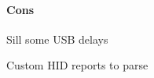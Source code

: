 \documentclass[a4paper,10pt]{article}
\begin{document}
\begin{multicols}{2}
\paragraph{Cons}
\begin{itemize*}
	\item Sill some USB delays
	\item Custom HID reports to parse
	\item \TODO
\end{itemize*}





\end{multicols}
\end{document}
